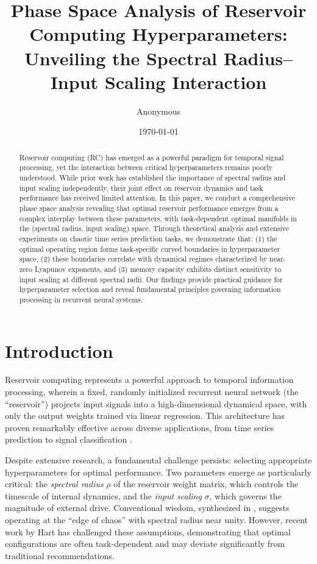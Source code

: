 \documentclass[11pt]{article}
\title{\textbf{Phase Space Analysis of Reservoir Computing Hyperparameters:\\Unveiling the Spectral Radius--Input Scaling Interaction}}
\author{Anonymous}
\date{\today}
\begin{document}
\maketitle

\begin{abstract}
Reservoir computing (RC) has emerged as a powerful paradigm for temporal signal processing, yet the interaction between critical hyperparameters remains poorly understood. While prior work has established the importance of spectral radius and input scaling independently, their joint effect on reservoir dynamics and task performance has received limited attention. In this paper, we conduct a comprehensive phase space analysis revealing that optimal reservoir performance emerges from a complex interplay between these parameters, with task-dependent optimal manifolds in the (spectral radius, input scaling) space. Through theoretical analysis and extensive experiments on chaotic time series prediction tasks, we demonstrate that: (1) the optimal operating region forms task-specific curved boundaries in hyperparameter space, (2) these boundaries correlate with dynamical regimes characterized by near-zero Lyapunov exponents, and (3) memory capacity exhibits distinct sensitivity to input scaling at different spectral radii. Our findings provide practical guidance for hyperparameter selection and reveal fundamental principles governing information processing in recurrent neural systems.
\end{abstract}

\section{Introduction}

Reservoir computing \cite{jaeger2001echo, maass2002real} represents a powerful approach to temporal information processing, wherein a fixed, randomly initialized recurrent neural network (the ``reservoir'') projects input signals into a high-dimensional dynamical space, with only the output weights trained via linear regression. This architecture has proven remarkably effective across diverse applications, from time series prediction to signal classification \cite{lukosevicius2012practical}.

Despite extensive research, a fundamental challenge persists: selecting appropriate hyperparameters for optimal performance. Two parameters emerge as particularly critical: the \emph{spectral radius} $\rho$ of the reservoir weight matrix, which controls the timescale of internal dynamics, and the \emph{input scaling} $\sigma$, which governs the magnitude of external drive. Conventional wisdom, synthesized in \cite{lukosevicius2012practical}, suggests operating at the ``edge of chaos'' with spectral radius near unity. However, recent work by Hart \cite{hart2021thesis, hart2022exploring} has challenged these assumptions, demonstrating that optimal configurations are often task-dependent and may deviate significantly from traditional recommendations.
\end{document}
